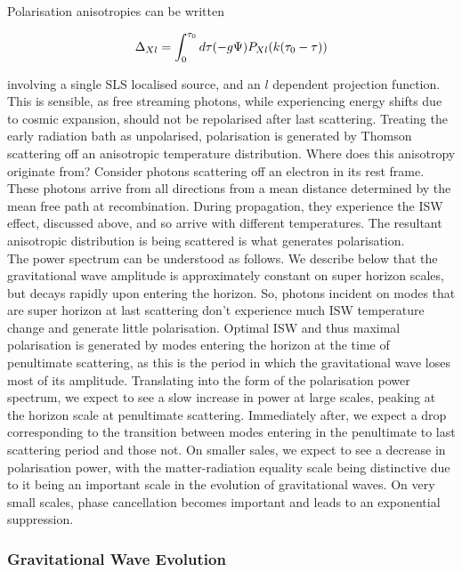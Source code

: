 \documentclass[a4paper,10pt]{article}
\begin{document}
Polarisation anisotropies can be written

\begin{equation}
\Delta_{Xl} = \int_0^{\tau_0} d\tau (-g\Psi) P_{Xl}(k(\tau_0-\tau))\\
\end{equation}

involving a single SLS localised source, and an $l$ dependent projection function. This is sensible, as free streaming photons, while experiencing energy shifts due to cosmic expansion, should not be repolarised after last scattering. Treating the early radiation bath as unpolarised, polarisation is generated by Thomson scattering off an anisotropic temperature distribution. Where does this anisotropy originate from? Consider photons scattering off an electron in its rest frame. These photons arrive from all directions from a mean distance determined by the mean free path at recombination. During propagation, they experience the ISW effect, discussed above, and so arrive with different temperatures. The resultant anisotropic distribution is being scattered is what generates polarisation. \\

The power spectrum can be understood as follows. We describe below that the gravitational wave amplitude is approximately constant on super horizon scales, but decays rapidly upon entering the horizon. So, photons incident on modes that are super horizon at last scattering don't experience much ISW temperature change and generate little polarisation. Optimal ISW and thus maximal polarisation is generated by modes entering the horizon at the time of penultimate scattering, as this is the period in which the gravitational wave loses most of its amplitude. Translating into the form of the polarisation power spectrum, we expect to see a slow increase in power at large scales, peaking at the horizon scale at penultimate scattering. Immediately after, we expect a drop corresponding to the transition between modes entering in the penultimate to last scattering period and those not. On smaller sales, we expect to see a decrease in polarisation power, with the matter-radiation equality scale being distinctive due to it being an important scale in the evolution of gravitational waves. On very small scales, phase cancellation becomes important and leads to an exponential suppression. 

\subsubsection{Gravitational Wave Evolution}
\end{document}
